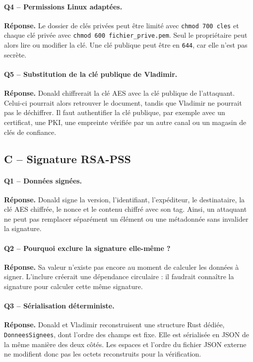 \documentclass[11pt,a4paper]{article}
\newcommand{\commande}[1]{\texttt{#1}}
\newcommand{\reponse}{\textbf{Réponse.} }
\begin{document}
\paragraph{Q4 -- Permissions Linux adaptées.}
\reponse Le dossier de clés privées peut être limité avec \commande{chmod 700 cles}
et chaque clé privée avec \commande{chmod 600 fichier\_prive.pem}. Seul le
propriétaire peut alors lire ou modifier la clé. Une clé publique peut être en
\commande{644}, car elle n'est pas secrète.

\paragraph{Q5 -- Substitution de la clé publique de Vladimir.}
\reponse Donald chiffrerait la clé AES avec la clé publique de l'attaquant. Celui-ci
pourrait alors retrouver le document, tandis que Vladimir ne pourrait pas le déchiffrer.
Il faut authentifier la clé publique, par exemple avec un certificat, une PKI, une
empreinte vérifiée par un autre canal ou un magasin de clés de confiance.

\subsection{C -- Signature RSA-PSS}

\paragraph{Q1 -- Données signées.}
\reponse Donald signe la version, l'identifiant, l'expéditeur, le destinataire, la clé
AES chiffrée, le nonce et le contenu chiffré avec son tag. Ainsi, un attaquant ne peut
pas remplacer séparément un élément ou une métadonnée sans invalider la signature.

\paragraph{Q2 -- Pourquoi exclure la signature elle-même ?}
\reponse Sa valeur n'existe pas encore au moment de calculer les données à signer.
L'inclure créerait une dépendance circulaire : il faudrait connaître la signature pour
calculer cette même signature.

\paragraph{Q3 -- Sérialisation déterministe.}
\reponse Donald et Vladimir reconstruisent une structure Rust dédiée,
\texttt{DonneesSignees}, dont l'ordre des champs est fixe. Elle est sérialisée en JSON
de la même manière des deux côtés. Les espaces et l'ordre du fichier JSON externe ne
modifient donc pas les octets reconstruits pour la vérification.
\end{document}

